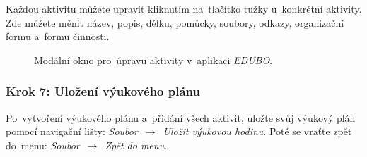 \documentclass[male,czech,api_bc]{kitheses}
\begin{document}
Každou aktivitu můžete upravit kliknutím na~tlačítko tužky u~konkrétní aktivity. Zde můžete měnit název, popis, délku, pomůcky, soubory, odkazy, organizační formu a~formu činnosti.

\begin{figure}[H]
	\centering
	\caption{Modální okno pro~úpravu aktivity v~aplikaci \textit{EDUBO}.}
	\label{fig:manual-2}
\end{figure}

\subsubsection{Krok 7: Uložení výukového plánu}
Po~vytvoření výukového plánu a~přidání všech aktivit, uložte svůj výukový plán pomocí navigační lišty: \textit{Soubor}~$\rightarrow$~\textit{Uložit výukovou hodinu}. Poté se vraťte zpět do~menu: \textit{Soubor}~$\rightarrow$~\textit{Zpět do menu}.
\end{document}
